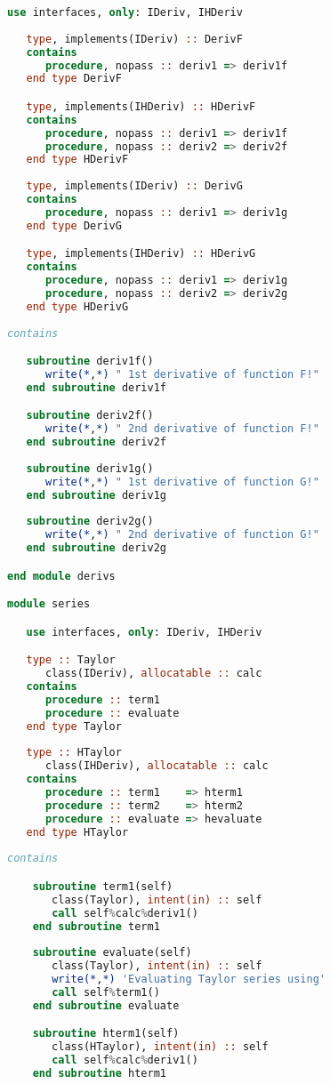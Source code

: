 \documentclass[11pt,oneside]{article}
\begin{document}
\begin{appendices}
\begin{lstlisting}[language=Fortran]
   use interfaces, only: IDeriv, IHDeriv
   
   type, implements(IDeriv) :: DerivF
   contains
      procedure, nopass :: deriv1 => deriv1f
   end type DerivF

   type, implements(IHDeriv) :: HDerivF
   contains
      procedure, nopass :: deriv1 => deriv1f
      procedure, nopass :: deriv2 => deriv2f
   end type HDerivF
   
   type, implements(IDeriv) :: DerivG
   contains
      procedure, nopass :: deriv1 => deriv1g
   end type DerivG

   type, implements(IHDeriv) :: HDerivG
   contains
      procedure, nopass :: deriv1 => deriv1g
      procedure, nopass :: deriv2 => deriv2g
   end type HDerivG
   
contains

   subroutine deriv1f()
      write(*,*) " 1st derivative of function F!"
   end subroutine deriv1f

   subroutine deriv2f()
      write(*,*) " 2nd derivative of function F!"
   end subroutine deriv2f
   
   subroutine deriv1g()
      write(*,*) " 1st derivative of function G!"
   end subroutine deriv1g
   
   subroutine deriv2g()
      write(*,*) " 2nd derivative of function G!"
   end subroutine deriv2g

end module derivs

module series

   use interfaces, only: IDeriv, IHDeriv

   type :: Taylor
      class(IDeriv), allocatable :: calc
   contains
      procedure :: term1
      procedure :: evaluate
   end type Taylor
   
   type :: HTaylor
      class(IHDeriv), allocatable :: calc
   contains
      procedure :: term1    => hterm1
      procedure :: term2    => hterm2
      procedure :: evaluate => hevaluate
   end type HTaylor
 
contains

    subroutine term1(self)
       class(Taylor), intent(in) :: self
       call self%calc%deriv1()
    end subroutine term1
    
    subroutine evaluate(self)
       class(Taylor), intent(in) :: self
       write(*,*) 'Evaluating Taylor series using'
       call self%term1()
    end subroutine evaluate

    subroutine hterm1(self)
       class(HTaylor), intent(in) :: self
       call self%calc%deriv1()
    end subroutine hterm1
    

\end{lstlisting}
\end{appendices}
\end{document}
